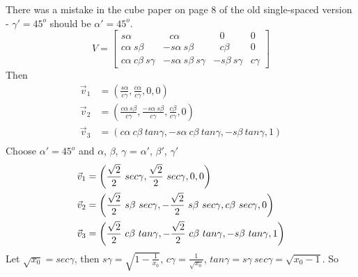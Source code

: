 There was a mistake in the cube paper on page 8 of the old single-spaced
version - $\gamma' = 45^o$ should be $\alpha' = 45^o$.
\begin{equation*}
V =
\left[
\begin{array}{lllc}
s\alpha                & ~~\:c\alpha                &  ~~~0              & 0       \\
c\alpha~s\beta         &    -s\alpha~s\beta         & ~~\:c\beta         & 0       \\
c\alpha~c\beta~s\gamma &    -s\alpha~s\beta~s\gamma &    -s\beta~s\gamma & c\gamma
\end{array}
\right]
\end{equation*}
Then
\begin{align*}
\vec{v}_1 &= \left(
               \frac{s\alpha}{c\gamma},
               \frac{c\alpha}{c\gamma},
               0,
               0
             \right) \\
\vec{v}_2 &= \left(
               \frac{ c\alpha~s\beta}{c\gamma},
               \frac{-s\alpha~s\beta}{c\gamma},
               \frac{c\beta}{c\gamma},
               0
             \right) \\
\vec{v}_3 &= \left(
               c\alpha~c\beta~tan\gamma,
              -s\alpha~c\beta~tan\gamma,
              -s\beta~tan\gamma,
               1
             \right) \\
\end{align*}
Choose $\alpha' = 45^o$ and $\alpha$, $\beta$, $\gamma$ = $\alpha'$, $\beta'$,
$\gamma'$
\begin{align*}
\vec{v}_1 &= \left(
               \hs2~sec\gamma,
               \hs2~sec\gamma,
               0,
               0
             \right) \\
\vec{v}_2 &= \left(
               \hs2~s\beta~sec\gamma,
              -\hs2~s\beta~sec\gamma,
                    c\beta~sec\gamma,
               0
             \right) \\
\vec{v}_3 &= \left(
               \hs2~c\beta~tan\gamma,
              -\hs2~c\beta~tan\gamma,
                   -s\beta~tan\gamma,
               1
             \right)
\end{align*}
Let $\sqrt{x_0} = sec\gamma$, then $s\gamma = \sqrt{1-\frac{1}{x_0}}$,
$c\gamma = \frac{1}{\sqrt{x_0}}$, $tan\gamma = s\gamma~sec\gamma =
\sqrt{x_0-1}$.  So
